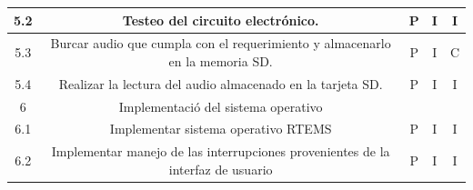 \documentclass[11pt]{charter}
\begin{document}
\begin{table}[]
\begin{tabular}{|c|c|c|c|c|}
5.2                                                                                            & Testeo del circuito electrónico.                                                   & P                                                                           & I                                                                  & I                                                                    \\ \hline
5.3                                                                                            & Burcar audio que cumpla con el requerimiento  y almacenarlo en la memoria SD.      & P                                                                           & I                                                                  & C                                                                    \\ \hline
5.4                                                                                            & Realizar la lectura del audio almacenado en la tarjeta SD.                         & P                                                                           & I                                                                  & I                                                                    \\ \hline
\rowcolor[HTML]{CBCEFB} 
6                                                                                              & Implementació del sistema operativo                                                &                                                                             &                                                                    &                                                                      \\ \hline
6.1                                                                                            & Implementar sistema operativo RTEMS                                                & P                                                                           & I                                                                  & I                                                                    \\ \hline
6.2                                                                                            & Implementar manejo de las interrupciones  provenientes de la interfaz de usuario   & P                                                                           & I                                                                  & I                                                                    \\ \hline

\end{tabular}
\end{table}
\end{document}
